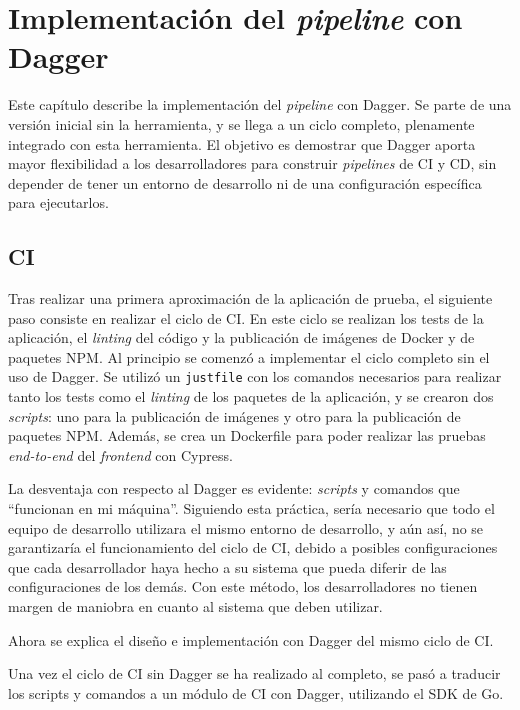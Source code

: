 \chapter{Implementación del \textit{pipeline} con Dagger}
\label{chap:dagger}

Este capítulo describe la implementación del \textit{pipeline} con Dagger. Se parte de una versión inicial sin la herramienta, y se llega a un ciclo completo, plenamente integrado con esta herramienta. El objetivo es demostrar que Dagger aporta mayor flexibilidad a los desarrolladores para construir \textit{pipelines} de CI y CD, sin depender de tener un entorno de desarrollo ni de una configuración específica para ejecutarlos.

\section{CI}

Tras realizar una primera aproximación de la aplicación de prueba, el siguiente paso consiste en realizar el ciclo de CI. En este ciclo se realizan los tests de la aplicación, el \textit{linting} del código y la publicación de imágenes de Docker y de paquetes NPM. Al principio se comenzó a implementar el ciclo completo sin el uso de Dagger. Se utilizó un \texttt{justfile} con los comandos necesarios para realizar tanto los tests como el \textit{linting} de los paquetes de la aplicación, y se crearon dos \textit{scripts}: uno para la publicación de imágenes y otro para la publicación de paquetes NPM. Además, se crea un Dockerfile para poder realizar las pruebas \textit{end-to-end} del \textit{frontend} con Cypress\cite{cypress}.

La desventaja con respecto al Dagger es evidente: \textit{scripts} y comandos que ``funcionan en mi máquina''. Siguiendo esta práctica, sería necesario que todo el equipo de desarrollo utilizara el mismo entorno de desarrollo, y aún así, no se garantizaría el funcionamiento del ciclo de CI, debido a posibles configuraciones que cada desarrollador haya hecho a su sistema que pueda diferir de las configuraciones de los demás. Con este método, los desarrolladores no tienen margen de maniobra en cuanto al sistema que deben utilizar.

Ahora se explica el diseño e implementación con Dagger del mismo ciclo de CI.

Una vez el ciclo de CI sin Dagger se ha realizado al completo, se pasó a traducir los scripts y comandos a un módulo de CI con Dagger, utilizando el SDK de Go.


